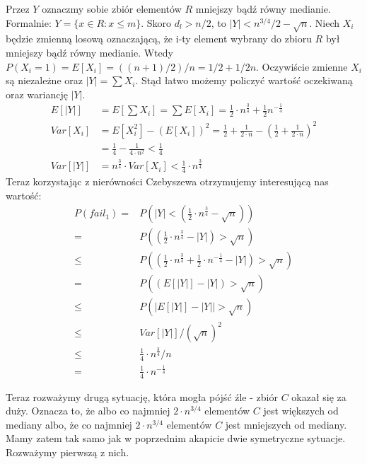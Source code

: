 Przez $Y$ oznaczmy sobie zbiór elementów $R$ mniejszy bądź równy medianie.
Formalnie: $Y = \{ x \in R: x \leq m\}$.
Skoro $d_l> n/2$, to $|Y| < n^{3/4}/2 - \sqrt{n}$.
Niech $X_i$ będzie zmienną losową oznaczającą, że i-ty element wybrany do zbioru $R$ był mniejszy bądź równy medianie.
Wtedy $P(X_i = 1) = E[X_i] = ((n+1)/2)/n = 1/2 + 1/2n$.
Oczywiście zmienne $X_i$ są niezależne oraz $|Y| = \sum X_i$.
Stąd łatwo możemy policzyć wartość oczekiwaną oraz wariancję $|Y|$.
\begin{align*} 
    E[|Y|] & = E\left[\sum X_i\right] = \sum E[X_i] = \frac{1}{2} \cdot n^{\frac{3}{4}} + \frac{1}{2}n^{-\frac{1}{4}} \\
    Var[X_i] & = E\left[X_i^2\right] - (E[X_i])^2 = \frac{1}{2} + \frac{1}{2 \cdot n}- (\frac{1}{2} + \frac{1}{2 \cdot n})^2 \\
             & = \frac{1}{4} - \frac{1}{4 \cdot n^2} < \frac{1}{4} \\
 Var[|Y|] & = n^{\frac{3}{4}} \cdot Var[X_i] < \frac{1}{4} \cdot n^{\frac{3}{4}}
\end{align*}
Teraz korzystając z nierówności Czebyszewa otrzymujemy interesującą nas wartość:
\begin{align*}
 P\left(fail_1\right) = & P\left(|Y| < \left(\frac{1}{2} \cdot n^{\frac{3}{4}} - \sqrt{n}\right)\right) \\
                      = & P\left(\left(\frac{1}{2} \cdot n^{\frac{3}{4}} - |Y|\right) > \sqrt{n}\right) \\
                      \leq & P\left(\left(\frac{1}{2} \cdot n^{\frac{3}{4}} + \frac{1}{2} \cdot n^{-\frac{1}{4}} - |Y|\right) > \sqrt{n}\right) \\
                      = & P\left(\left(E[|Y|] - |Y|\right) > \sqrt{n}\right)\\
                      \leq & P\left(|E[|Y|] -|Y| | > \sqrt{n}\right) \\
                      \leq & Var[|Y|] / (\sqrt{n})^2 \\
                      \leq & \frac{1}{4} \cdot n^{\frac{3}{4}} / n \\
                      = & \frac{1}{4} \cdot n^{-\frac{1}{4}}
\end{align*}

Teraz rozważymy drugą sytuację, która mogła pójść źle - zbiór $C$ okazał się za duży.
Oznacza to, że albo co najmniej $2 \cdot n^{3/4}$ elementów $C$ jest większych od mediany albo, że co najmniej $2 \cdot n^{3/4}$ elementów $C$ jest mniejszych od mediany.
Mamy zatem tak samo jak w poprzednim akapicie dwie symetryczne sytuacje.
Rozważymy pierwszą z nich.

